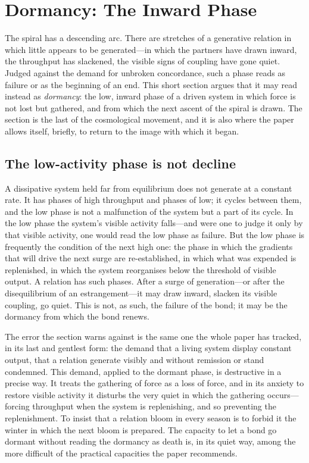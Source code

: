\section{Dormancy: The Inward Phase}
\label{p17:sec:rose}

\noindent
The spiral has a descending arc. There are stretches of a generative relation in which little appears to be generated---in which the partners have drawn inward, the throughput has slackened, the visible signs of coupling have gone quiet. Judged against the demand for unbroken concordance, such a phase reads as failure or as the beginning of an end. This short section argues that it may read instead as \emph{dormancy}: the low, inward phase of a driven system in which force is not lost but gathered, and from which the next ascent of the spiral is drawn. The section is the last of the cosmological movement, and it is also where the paper allows itself, briefly, to return to the image with which it began.

\subsection{The low-activity phase is not decline}
\label{p17:sub:rose-low}

A dissipative system held far from equilibrium does not generate at a constant rate. It has phases of high throughput and phases of low; it cycles between them, and the low phase is not a malfunction of the system but a part of its cycle. In the low phase the system's visible activity falls---and were one to judge it only by that visible activity, one would read the low phase as failure. But the low phase is frequently the condition of the next high one: the phase in which the gradients that will drive the next surge are re-established, in which what was expended is replenished, in which the system reorganises below the threshold of visible output. A relation has such phases. After a surge of generation---or after the disequilibrium of an estrangement---it may draw inward, slacken its visible coupling, go quiet. This is not, as such, the failure of the bond; it may be the dormancy from which the bond renews.

The error the section warns against is the same one the whole paper has tracked, in its last and gentlest form: the demand that a living system display constant output, that a relation generate visibly and without remission or stand condemned. This demand, applied to the dormant phase, is destructive in a precise way. It treats the gathering of force as a loss of force, and in its anxiety to restore visible activity it disturbs the very quiet in which the gathering occurs---forcing throughput when the system is replenishing, and so preventing the replenishment. To insist that a relation bloom in every season is to forbid it the winter in which the next bloom is prepared. The capacity to let a bond go dormant without reading the dormancy as death is, in its quiet way, among the more difficult of the practical capacities the paper recommends.

